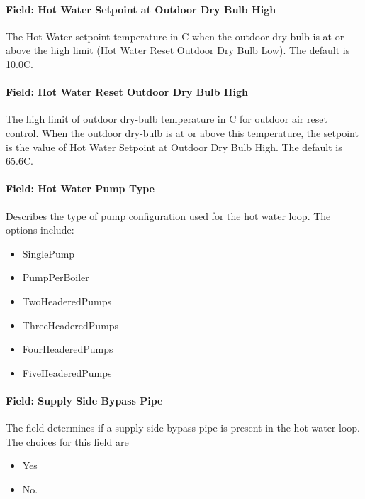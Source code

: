 \paragraph{Field: Hot Water Setpoint at Outdoor Dry Bulb High}\label{field-hot-water-setpoint-at-outdoor-dry-bulb-high}

The Hot Water setpoint temperature in C when the outdoor dry-bulb is at or above the high limit (Hot Water Reset Outdoor Dry Bulb Low). The default is 10.0C.

\paragraph{Field: Hot Water Reset Outdoor Dry Bulb High}\label{field-hot-water-reset-outdoor-dry-bulb-high}

The high limit of outdoor dry-bulb temperature in C for outdoor air reset control. When the outdoor dry-bulb is at or above this temperature, the setpoint is the value of Hot Water Setpoint at Outdoor Dry Bulb High. The default is 65.6C.

\paragraph{Field: Hot Water Pump Type}\label{field-hot-water-pump-type}

Describes the type of pump configuration used for the hot water loop. The options include:

\begin{itemize}
\item
  SinglePump
\item
  PumpPerBoiler
\item
  TwoHeaderedPumps
\item
  ThreeHeaderedPumps
\item
  FourHeaderedPumps
\item
  FiveHeaderedPumps
\end{itemize}

\paragraph{Field: Supply Side Bypass Pipe}\label{field-supply-side-bypass-pipe}

The field determines if a supply side bypass pipe is present in the hot water loop. The choices for this field are

\begin{itemize}
\item
  Yes
\item
  No.
\end{itemize}


